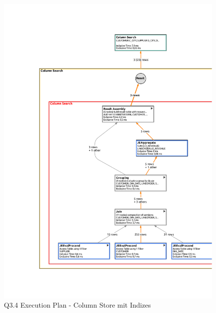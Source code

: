 \begin{figure}[H]
	\centering
	\includegraphics[width=\textwidth]{images/col_q34_index.pdf}
	\caption{Q3.4 Execution Plan - Column Store mit Indizes}\label{exec:q34-col-index}
\end{figure}

